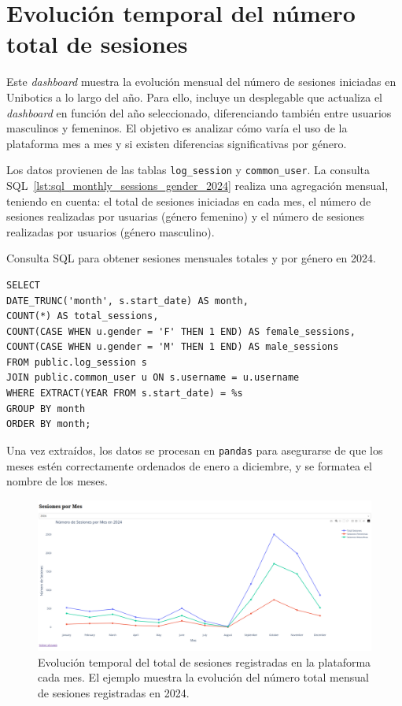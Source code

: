 \documentclass[a4paper, 12pt]{book}
\begin{document}
\section{Evolución temporal del número total de sesiones}
\label{sec:dash2c}

Este \textit{dashboard} muestra la evolución mensual del número de sesiones iniciadas en Unibotics a lo largo del año. Para ello, incluye un desplegable que actualiza el \textit{dashboard} en función del año seleccionado, diferenciando también entre usuarios masculinos y femeninos. El objetivo es analizar cómo varía el uso de la plataforma mes a mes y si existen diferencias significativas por género.

Los datos provienen de las tablas \texttt{log\_session} y \texttt{common\_user}. La consulta SQL~\ref{lst:sql_monthly_sessions_gender_2024} realiza una agregación mensual, teniendo en cuenta: el total de sesiones iniciadas en cada mes, el número de sesiones realizadas por usuarias (género femenino) y el número de sesiones realizadas por usuarios (género masculino).

\begin{listing}[h!]
\caption{Consulta SQL para obtener sesiones mensuales totales y por género en 2024.}
\label{lst:sql_monthly_sessions_gender_2024}
\begin{verbatim}
SELECT 
DATE_TRUNC('month', s.start_date) AS month,
COUNT(*) AS total_sessions,
COUNT(CASE WHEN u.gender = 'F' THEN 1 END) AS female_sessions,
COUNT(CASE WHEN u.gender = 'M' THEN 1 END) AS male_sessions
FROM public.log_session s
JOIN public.common_user u ON s.username = u.username
WHERE EXTRACT(YEAR FROM s.start_date) = %s
GROUP BY month
ORDER BY month;
\end{verbatim}
\end{listing}

Una vez extraídos, los datos se procesan en \texttt{pandas} para asegurarse de que los meses estén correctamente ordenados de enero a diciembre, y se formatea el nombre de los meses.

\begin{figure}[H]
  \centering
  \includegraphics[width=1.1\textwidth]{img/2c.png}
  \caption{Evolución temporal del total de sesiones registradas en la plataforma cada mes. El ejemplo muestra la evolución del número total mensual de sesiones registradas en 2024.}
  \label{fig:2c}
\end{figure}
\end{document}
